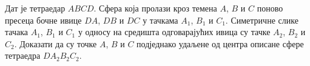\problem
Дат је тетраедар $ABCD$.
Сфера која пролази кроз темена $A$, $B$ и $C$ поново пресеца бочне ивице $DA$,
$DB$ и $DC$ у тачкама $A_1$, $B_1$ и $C_1$.
Симетричне слике тачака $A_1$, $B_1$ и $C_1$ у односу на средишта одговарајућих
ивица су тачке $A_2$, $B_2$ и $C_2$.
Доказати да су точке $A$, $B$ и $C$ подједнако удаљене од центра описане сфере
тетраедра $D A_2 B_2 C_2$. 

\solution

\endproblem
